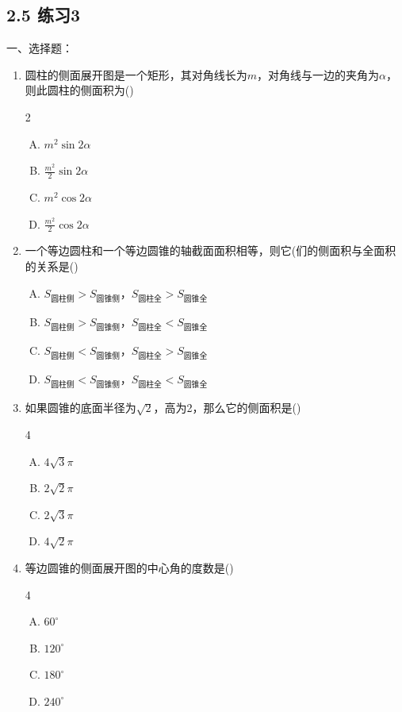 \subsection*{2.5 练习3}
一、选择题：
\begin{enumerate}
\item 圆柱的侧面展开图是一个矩形，其对角线长为$m$，对角线与一边的夹角为$\alpha$，则此圆柱的侧面积为\hfill (\quad )
\begin{multicols}{2}
 \begin{enumerate}[(A)]
    \item $m^2\sin2\alpha$
    \item $\frac{m^2}{2}\sin2\alpha$
    \item $m^2\cos2\alpha$
    \item $\frac{m^2}{2}\cos2\alpha$
\end{enumerate}   
\end{multicols}


\item 一个等边圆柱和一个等边圆锥的轴截面面积相等，则它(们的侧面积与全面积的关系是\hfill (\quad )
\begin{enumerate}[(A)]
\item $S_{\text{圆柱侧}}>S_{\text{圆锥侧}}$，$S_{\text{圆柱全}}>S_{\text{圆锥全}}$
\item $S_{\text{圆柱侧}}>S_{\text{圆锥侧}}$，$S_{\text{圆柱全}}<S_{\text{圆锥全}}$
\item $S_{\text{圆柱侧}}<S_{\text{圆锥侧}}$，$S_{\text{圆柱全}}>S_{\text{圆锥全}}$
\item $S_{\text{圆柱侧}}<S_{\text{圆锥侧}}$，$S_{\text{圆柱全}}<S_{\text{圆锥全}}$
\end{enumerate}

\item 如果圆锥的底面半径为$\sqrt{2}$，高为2，那么它的侧面积是\hfill (\quad )
\begin{multicols}{4}
   \begin{enumerate}[(A)]
    \item $4\sqrt{3}\pi$
    \item $2\sqrt{2}\pi$
    \item $2\sqrt{3}\pi$
    \item $4\sqrt{2}\pi$
\end{enumerate} 
\end{multicols}


\item 等边圆锥的侧面展开图的中心角的度数是\hfill (\quad )
\begin{multicols}{4}
  \begin{enumerate}[(A)]
    \item $60^{\circ}$
    \item $120^{\circ}$
    \item $180^{\circ}$
    \item $240^{\circ}$
\end{enumerate}  
\end{multicols}


\end{enumerate}
